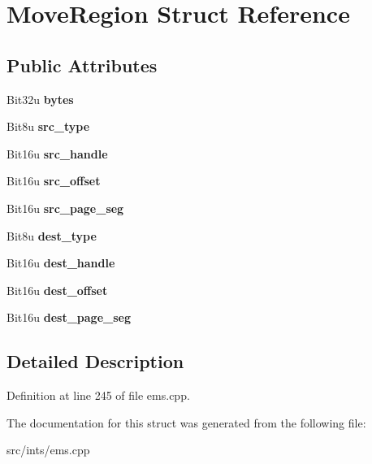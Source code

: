 \hypertarget{structMoveRegion}{\section{Move\-Region Struct Reference}
\label{structMoveRegion}
}
\subsection*{Public Attributes}
\begin{DoxyCompactItemize}
\item 
\hypertarget{structMoveRegion_ada38b05b3446e335d841d650849f9d5d}{Bit32u {\bfseries bytes}}\label{structMoveRegion_ada38b05b3446e335d841d650849f9d5d}

\item 
\hypertarget{structMoveRegion_a58be32d3a89f3d138f8e5f9b2f6ac045}{Bit8u {\bfseries src\-\_\-type}}\label{structMoveRegion_a58be32d3a89f3d138f8e5f9b2f6ac045}

\item 
\hypertarget{structMoveRegion_a63311208059116f9fe35ab840928bdf1}{Bit16u {\bfseries src\-\_\-handle}}\label{structMoveRegion_a63311208059116f9fe35ab840928bdf1}

\item 
\hypertarget{structMoveRegion_a342eb6b4ff673d978a2b532458fa74a6}{Bit16u {\bfseries src\-\_\-offset}}\label{structMoveRegion_a342eb6b4ff673d978a2b532458fa74a6}

\item 
\hypertarget{structMoveRegion_a69313d022b4712a2e78f6e34458ed10c}{Bit16u {\bfseries src\-\_\-page\-\_\-seg}}\label{structMoveRegion_a69313d022b4712a2e78f6e34458ed10c}

\item 
\hypertarget{structMoveRegion_a4475c59b94e5a93417ef80e4af630926}{Bit8u {\bfseries dest\-\_\-type}}\label{structMoveRegion_a4475c59b94e5a93417ef80e4af630926}

\item 
\hypertarget{structMoveRegion_a0f2a0c0e9a72bf10b5098fcd5f6a6379}{Bit16u {\bfseries dest\-\_\-handle}}\label{structMoveRegion_a0f2a0c0e9a72bf10b5098fcd5f6a6379}

\item 
\hypertarget{structMoveRegion_a992589a76ab78cf0708ab6adcda44348}{Bit16u {\bfseries dest\-\_\-offset}}\label{structMoveRegion_a992589a76ab78cf0708ab6adcda44348}

\item 
\hypertarget{structMoveRegion_aadb6e580104ef5f4668505b860d01f3f}{Bit16u {\bfseries dest\-\_\-page\-\_\-seg}}\label{structMoveRegion_aadb6e580104ef5f4668505b860d01f3f}

\end{DoxyCompactItemize}


\subsection{Detailed Description}


Definition at line 245 of file ems.\-cpp.



The documentation for this struct was generated from the following file\-:\begin{DoxyCompactItemize}
\item 
src/ints/ems.\-cpp\end{DoxyCompactItemize}

